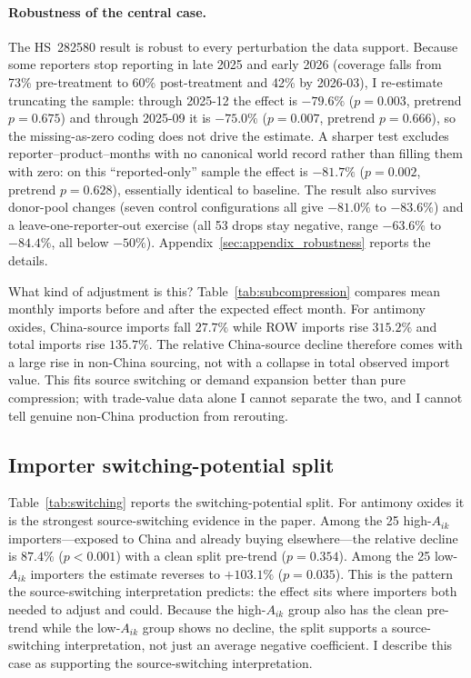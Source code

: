 \documentclass[12pt,a4paper]{article}
\begin{document}




\paragraph{Robustness of the central case.}
The HS~282580 result is robust to every perturbation the data support.
Because some reporters stop reporting in late 2025 and early 2026 (coverage
falls from 73\% pre-treatment to 60\% post-treatment and 42\% by 2026-03), I
re-estimate truncating the sample: through 2025-12 the effect is $-79.6\%$
($p=0.003$, pretrend $p=0.675$) and through 2025-09 it is $-75.0\%$
($p=0.007$, pretrend $p=0.666$), so the missing-as-zero coding does not drive
the estimate. A sharper test excludes reporter--product--months with no
canonical world record rather than filling them with zero: on this
``reported-only'' sample the effect is $-81.7\%$ ($p=0.002$, pretrend $p=0.628$),
essentially identical to baseline. The result also survives donor-pool changes
(seven control configurations all give $-81.0\%$ to $-83.6\%$) and a
leave-one-reporter-out exercise (all 53 drops stay negative, range $-63.6\%$
to $-84.4\%$, all below $-50\%$). Appendix~\ref{sec:appendix_robustness} reports
the details.

What kind of adjustment is this? Table~\ref{tab:subcompression} compares mean
monthly imports before and after the expected effect month. For antimony oxides,
China-source imports fall $27.7\%$ while ROW imports rise $315.2\%$ and total
imports rise $135.7\%$. The relative China-source decline therefore comes with a
large rise in non-China sourcing, not with a collapse in total observed import value.
This fits source switching or demand expansion better than pure compression; with
trade-value data alone I cannot separate the two, and I cannot tell genuine
non-China production from rerouting.





\subsection{Importer switching-potential split}\label{sec:mechanism}

Table~\ref{tab:switching} reports the switching-potential split. For antimony
oxides it is the strongest source-switching evidence in the paper. Among the 25
high-$A_{ik}$ importers---exposed to China and already buying elsewhere---the
relative decline is $87.4\%$ ($p<0.001$) with a clean split pre-trend ($p=0.354$).
Among the 25 low-$A_{ik}$ importers the estimate reverses to $+103.1\%$
($p=0.035$). This is the pattern the source-switching interpretation predicts: the effect sits
where importers both needed to adjust and could. Because the high-$A_{ik}$ group
also has the clean pre-trend while the low-$A_{ik}$ group shows no decline, the
split supports a source-switching interpretation, not just an average negative coefficient. I describe this
case as supporting the source-switching interpretation.
\end{document}
